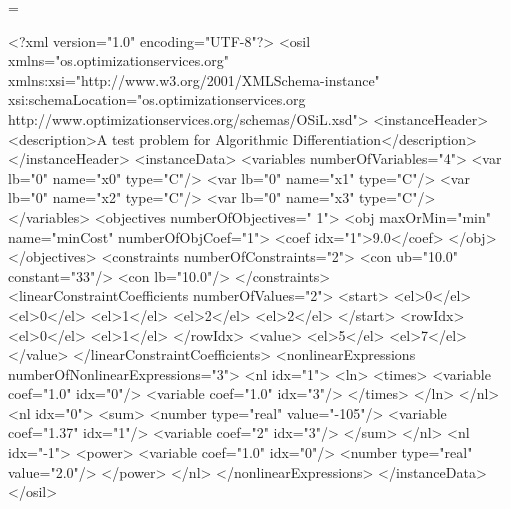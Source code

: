 \documentclass[11pt]{article}
\makeatletter
\renewcommand{\_}{{\char"5F}}
\renewcommand{\{}{{\char"7B}}
\renewcommand{\}}{{\char"7D}}
\renewcommand{\^}{{\char"0D}}
\renewcommand{\'}{{\char"0D}}
\let\realnormalsize=\normalsize
\def\preveqno{}\let\real@float=\@float \let\realend@float=\end@float
\def\@float{\let\@savefreelist\@freelist\real@float}
\def\liih@math{\ifmmode$\else\bad@math\fi}
\def\end@float{\realend@float\global\let\@freelist\@savefreelist}
\def\adjustnormalsize{\def\normalsize{\mathsurround=0pt \realnormalsize
 \parindent=0pt\abovedisplayskip=0pt\belowdisplayskip=0pt}%
 \def\phantompar{\csname par\endcsname}\normalsize}%
\def\lthtmltypeout#1{{\let\protect\string \immediate\write\lthtmlwrite{#1}}}%
\newcommand\lthtmlvboxmathA{\adjustnormalsize\setbox\sizebox=\vbox\bgroup %
 \let\ifinner=\iffalse \let\)\liih@math }%
\newcommand\lthtmlboxmathZ{\@next\next\@currlist{}{\def\next{\voidb@x}}%
 \expandafter\box\next\egroup}%
\newcommand\lthtmlmathtype[1]{\gdef\lthtmlmathenv{#1}}%
\newcommand\lthtmllogmath{\lthtmltypeout{l2hSize %
:\lthtmlmathenv:\the\ht\sizebox::\the\dp\sizebox::\the\wd\sizebox.\preveqno}}%
\newcommand\lthtmlfigureA[1]{\let\@savefreelist\@freelist
       \lthtmlmathtype{#1}\lthtmlvboxmathA}%
\newcommand\lthtmlfigureZ{\lthtmlboxmathZ\lthtmllogmath\copy\sizebox
       \global\let\@freelist\@savefreelist}%
\def\lthtmlcheckvsize{\ifdim\ht\sizebox<\vsize 
  \ifdim\wd\sizebox<\hsize\expandafter\hfill\fi \expandafter\vfill
  \else\expandafter\vss\fi}%
\makeatother
\begin{document}
{\newpage\clearpage
\lthtmlfigureA{verbatimtab2612}%
\begin{verbatimtab}
<?xml version="1.0" encoding="UTF-8"?>
<osil  xmlns="os.optimizationservices.org"
     xmlns:xsi="http://www.w3.org/2001/XMLSchema-instance"
     xsi:schemaLocation="os.optimizationservices.org
     http://www.optimizationservices.org/schemas/OSiL.xsd">
	<instanceHeader>
		<description>A test problem for Algorithmic Differentiation</description>
	</instanceHeader>
	<instanceData>
		<variables numberOfVariables="4">
			<var lb="0" name="x0" type="C"/>
			<var lb="0" name="x1" type="C"/>
			<var lb="0" name="x2" type="C"/>
			<var lb="0" name="x3" type="C"/>
		</variables>
		<objectives numberOfObjectives=" 1">
			<obj maxOrMin="min" name="minCost" numberOfObjCoef="1">
				<coef idx="1">9.0</coef>
			</obj>
		</objectives>
		<constraints numberOfConstraints="2">
			<con ub="10.0" constant="33"/>
			<con lb="10.0"/>
		</constraints>
		<linearConstraintCoefficients numberOfValues="2">
			<start>
				<el>0</el>
				<el>0</el>
				<el>1</el>
				<el>2</el>
				<el>2</el>
			</start>
			<rowIdx>
				<el>0</el>
				<el>1</el>
			</rowIdx>
			<value>
				<el>5</el>
				<el>7</el>
			</value>
		</linearConstraintCoefficients>
		<nonlinearExpressions numberOfNonlinearExpressions="3">
			<nl idx="1">
				<ln>
					<times>
						<variable coef="1.0" idx="0"/>
						<variable coef="1.0" idx="3"/>
					</times>	
				</ln>
			</nl>
			<nl idx="0">
				<sum>
					<number type="real" value="-105"/>
					<variable coef="1.37" idx="1"/>
					<variable coef="2" idx="3"/>
				</sum>	
			</nl>
			<nl idx="-1">
				<power>
					<variable coef="1.0" idx="0"/>
					<number type="real" value="2.0"/>
				</power>
			</nl>
		</nonlinearExpressions>
	</instanceData>
</osil>
\end{verbatimtab}%
\lthtmlfigureZ
\lthtmlcheckvsize\clearpage}
\end{document}
